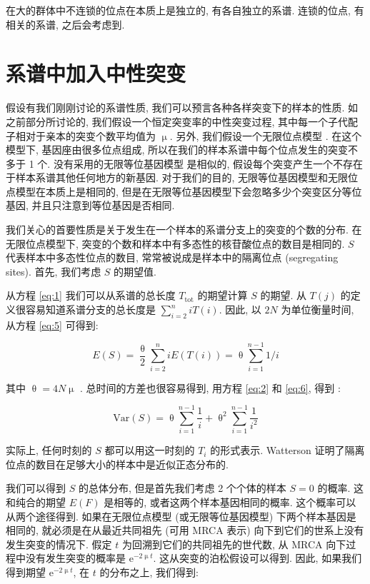 \documentclass[12pt]{article}
\begin{document}
在大的群体中不连锁的位点在本质上是独立的, 有各自独立的系谱. 连锁的位点, 有相关的系谱, 之后会考虑到.

\section{系谱中加入中性突变}

假设有我们刚刚讨论的系谱性质, 我们可以预言各种各样突变下的样本的性质. 如之前部分所讨论的,
我们假设一个恒定突变率的中性突变过程, 其中每一个子代配子相对于亲本的突变个数平均值为 $\upmu$. 另外,
我们假设一个无限位点模型 \parencite{kimura1969}. 在这个模型下, 基因座由很多位点组成,
所以在我们的样本系谱中每个位点发生的突变不多于 1 个. 没有采用的无限等位基因模型 \parencite{kimura1964} 是相似的,
假设每个突变产生一个不存在于样本系谱其他任何地方的新基因. 对于我们的目的, 无限等位基因模型和无限位点模型在本质上是相同的,
但是在无限等位基因模型下会忽略多少个突变区分等位基因, 并且只注意到等位基因是否相同.

我们关心的首要性质是关于发生在一个样本的系谱分支上的突变的个数的分布. 在无限位点模型下,
突变的个数和样本中有多态性的核苷酸位点的数目是相同的. $S$ 代表样本中多态性位点的数目, 常常被说成是样本中的隔离位点
(segregating sites). 首先, 我们考虑 $S$ 的期望值.

从方程 \ref{eq:1} 我们可以从系谱的总长度 $T_{\text{tot}}$ 的期望计算 $S$ 的期望. 从 $T(j)$
的定义很容易知道系谱分支的总长度是 $\sum_{i=2}^{n} i T(i)$. 因此, 以 $2N$ 为单位衡量时间, 从方程
\ref{eq:5} 可得到:

\begin{equation} \label{eq:6}
    E(S)=\frac{\uptheta}{2} \sum_{i=2}^{n} iE(T(i)) = \uptheta \sum_{i=1}^{n-1}1/i
\end{equation}

其中 $\uptheta = 4N \upmu$ \parencite{watterson1975}. 总时间的方差也很容易得到, 用方程 \ref{eq:2} 和 \ref{eq:6}, 得到
\parencite{watterson1975}:

\begin{equation} \label{eq:7}
    \text{Var}(S) = \uptheta \sum_{i=1}^{n-1} \frac{1}{i} + \uptheta^{2} \sum_{i=1}^{n-1} \frac{1}{i^{2}}
\end{equation}

实际上, 任何时刻的 $S$ 都可以用这一时刻的 $T_{i}$ 的形式表示. Watterson
证明了隔离位点的数目在足够大小的样本中是近似正态分布的.

我们可以得到 $S$ 的总体分布, 但是首先我们考虑 2 个个体的样本 $S=0$ 的概率. 这和纯合的期望 $E(F)$ 是相等的,
或者这两个样本基因相同的概率. 这个概率可以从两个途径得到. 如果在无限位点模型 (或无限等位基因模型) 下两个样本基因是相同的,
就必须是在从最近共同祖先 (可用 MRCA 表示) 向下到它们的世系上没有发生突变的情况下. 假定 $t$
为回溯到它们的共同祖先的世代数, 从 MRCA 向下过程中没有发生突变的概率是 $\mathrm{e}^{-2\upmu t}$.
这从突变的泊松假设可以得到. 因此, 如果我们得到期望 $\mathrm{e}^{-2\upmu t}$, 在 $t$ 的分布之上, 我们得到:
\end{document}
